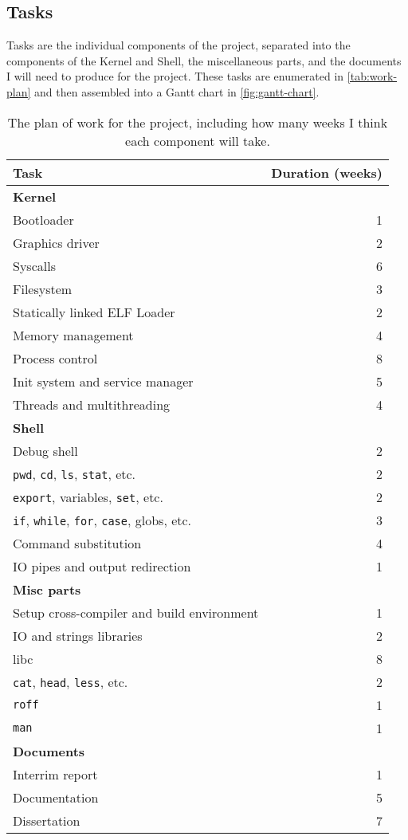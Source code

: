 \documentclass{article}
\begin{document}
\subsection*{Tasks}
Tasks are the individual components of the project, separated into the
components of the Kernel and Shell, the miscellaneous parts, and the documents
I will need to produce for the project. These tasks are enumerated in
\autoref{tab:work-plan} and then assembled into a Gantt chart in
\autoref{fig:gantt-chart}.
\begin{table}[tbp]
\begin{center}
\begin{tabular}{|l|r|}
    \hline
    Task & Duration (weeks)\\
    \hline \textbf{Kernel} &\\
    Bootloader & 1\\
    Graphics driver & 2\\
    Syscalls & 6\\
    Filesystem & 3\\
    Statically linked ELF Loader & 2\\
    Memory management & 4\\
    Process control & 8\\
    Init system and service manager & 5\\
    Threads and multithreading & 4\\
    \hline \textbf{Shell} &\\
    Debug shell & 2\\
    \texttt{pwd}, \texttt{cd}, \texttt{ls}, \texttt{stat}, etc. & 2\\
    \texttt{export}, variables, \texttt{set}, etc. & 2\\
    \texttt{if}, \texttt{while}, \texttt{for}, \texttt{case}, globs, etc. & 3\\
    Command substitution & 4\\
    IO pipes and output redirection & 1\\
    \hline \textbf{Misc parts} &\\
    Setup cross-compiler and build environment & 1\\
    IO and strings libraries & 2\\
    libc & 8\\
    \texttt{cat}, \texttt{head}, \texttt{less}, etc. & 2\\
    \texttt{roff} & 1\\
    \texttt{man} & 1\\
    \hline \textbf{Documents} &\\
    Interrim report & 1\\
    Documentation & 5\\
    Dissertation & 7\\
    \hline
\end{tabular}
\caption{The plan of work for the project, including how many weeks I think
each component will take.}
\label{tab:work-plan}
\end{center}
\end{table}
\end{document}
